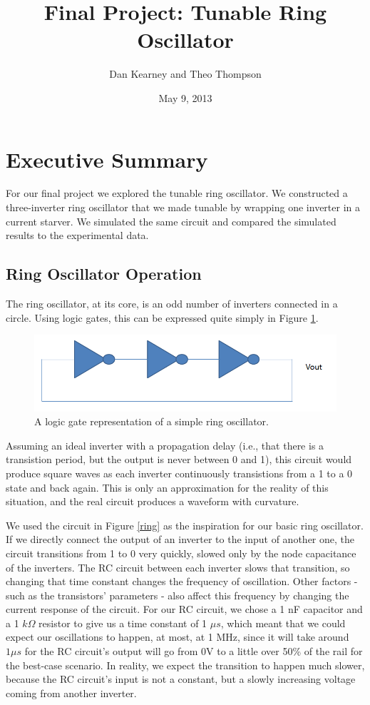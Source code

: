 \documentclass{article}
\title{Final Project: Tunable Ring Oscillator}
\author{Dan Kearney and Theo Thompson}
\date{May 9, 2013}
\begin{document}
\maketitle

\section*{Executive Summary}

For our final project we explored the tunable ring oscillator.  We constructed a three-inverter ring oscillator that we made tunable by wrapping one inverter in a current starver.  We simulated the same circuit and compared the simulated results to the experimental data.

\subsection*{Ring Oscillator Operation}

The ring oscillator, at its core, is an odd number of inverters connected in a circle.  Using logic gates, this can be expressed quite simply in Figure \ref{simpleSchem}.

\begin{figure}[H]
\centering
\includegraphics[scale=.4]{simpleSchem.png}
\caption{A logic gate representation of a simple ring oscillator.}
\label{simpleSchem}
\end{figure}

Assuming an ideal inverter with a propagation delay (i.e., that there is a transistion period, but the output is never between 0 and 1), this circuit would produce square waves as each inverter continuously transistions from a 1 to a 0 state and back again.  This is only an approximation for the reality of this situation, and the real circuit produces a waveform with curvature.

We used the circuit in Figure \ref{ring} as the inspiration for our basic ring oscillator.  If we directly connect the output of an inverter to the input of another one, the circuit transitions from 1 to 0 very quickly, slowed only by the node capacitance of the inverters.  The RC circuit between each inverter slows that transition, so changing that time constant changes the frequency of oscillation.  Other factors - such as the transistors' parameters - also affect this frequency by changing the current response of the circuit.  For our RC circuit, we chose a 1 nF capacitor and a 1 $k\Omega$ resistor to give us a time constant of 1 $\mu s$, which meant that we could expect our oscillations to happen, at most, at 1 MHz, since it will take around $1 \mu s$ for the RC circuit's output will go from 0V to a little over 50\% of the rail for the best-case scenario.  In reality, we expect the transition to happen much slower, because the RC circuit's input is not a constant, but a slowly increasing voltage coming from another inverter. 
\end{document}
